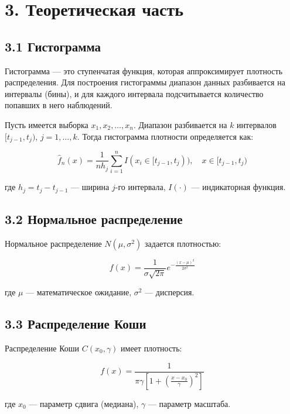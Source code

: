 \documentclass[a4paper,14pt]{extarticle}
\begin{document}
\section*{3. Теоретическая часть}

\subsection*{3.1 Гистограмма}

Гистограмма — это ступенчатая функция, которая аппроксимирует плотность распределения. Для построения гистограммы диапазон данных разбивается на интервалы (бины), и для каждого интервала подсчитывается количество попавших в него наблюдений.

Пусть имеется выборка $x_1, x_2, \ldots, x_n$. Диапазон разбивается на $k$ интервалов $[t_{j-1}, t_j)$, $j = 1, \ldots, k$. Тогда гистограмма плотности определяется как:

\begin{equation}
\hat{f}_n(x) = \frac{1}{n h_j} \sum_{i=1}^{n} I(x_i \in [t_{j-1}, t_j)), \quad x \in [t_{j-1}, t_j)
\end{equation}

где $h_j = t_j - t_{j-1}$ — ширина $j$-го интервала, $I(\cdot)$ — индикаторная функция.

\subsection*{3.2 Нормальное распределение}

Нормальное распределение $N(\mu, \sigma^2)$ задается плотностью:

\begin{equation}
f(x) = \frac{1}{\sigma\sqrt{2\pi}} e^{-\frac{(x-\mu)^2}{2\sigma^2}}
\end{equation}

где $\mu$ — математическое ожидание, $\sigma^2$ — дисперсия.

\subsection*{3.3 Распределение Коши}

Распределение Коши $C(x_0, \gamma)$ имеет плотность:

\begin{equation}
f(x) = \frac{1}{\pi \gamma \left[1 + \left(\frac{x-x_0}{\gamma}\right)^2\right]}
\end{equation}

где $x_0$ — параметр сдвига (медиана), $\gamma$ — параметр масштаба.
\end{document}

